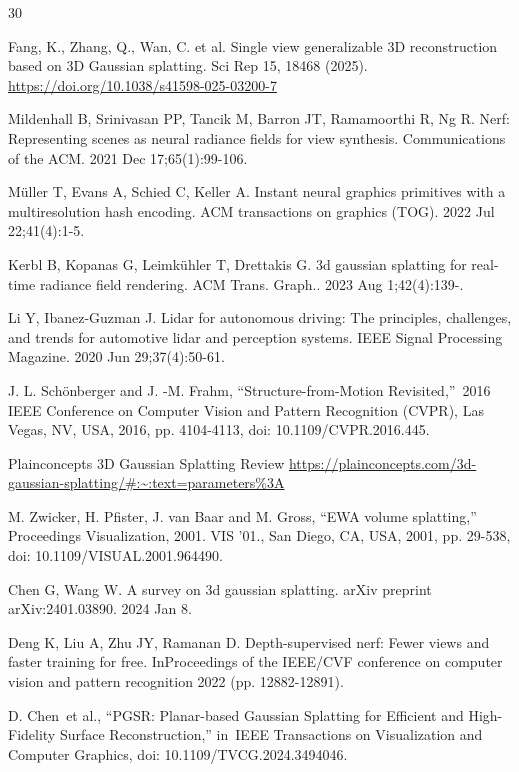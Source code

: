 \documentclass[11pt,a4paper]{article}
\begin{document}
\clearpage
{}
{}
\begin{thebibliography}{30}

Fang, K., Zhang, Q., Wan, C. et al. Single view generalizable 3D reconstruction based on 3D Gaussian splatting. Sci Rep 15, 18468 (2025). \url{https://doi.org/10.1038/s41598-025-03200-7}

Mildenhall B, Srinivasan PP, Tancik M, Barron JT, Ramamoorthi R, Ng R. Nerf: Representing scenes as neural radiance fields for view synthesis. Communications of the ACM. 2021 Dec 17;65(1):99-106.

Müller T, Evans A, Schied C, Keller A. Instant neural graphics primitives with a multiresolution hash encoding. ACM transactions on graphics (TOG). 2022 Jul 22;41(4):1-5.

Kerbl B, Kopanas G, Leimkühler T, Drettakis G. 3d gaussian splatting for real-time radiance field rendering. ACM Trans. Graph.. 2023 Aug 1;42(4):139-.

Li Y, Ibanez-Guzman J. Lidar for autonomous driving: The principles, challenges, and trends for automotive lidar and perception systems. IEEE Signal Processing Magazine. 2020 Jun 29;37(4):50-61.

J. L. Schönberger and J. -M. Frahm, ``Structure-from-Motion Revisited,''~2016 IEEE Conference on Computer Vision and Pattern Recognition (CVPR), Las Vegas, NV, USA, 2016, pp. 4104-4113, doi: 10.1109/CVPR.2016.445.

Plainconcepts 3D Gaussian Splatting Review \url{https://plainconcepts.com/3d-gaussian-splatting/#:~:text=parameters%3A}

M. Zwicker, H. Pfister, J. van Baar and M. Gross, ``EWA volume splatting,'' Proceedings Visualization, 2001. VIS '01., San Diego, CA, USA, 2001, pp. 29-538, doi: 10.1109/VISUAL.2001.964490.

Chen G, Wang W. A survey on 3d gaussian splatting. arXiv preprint arXiv:2401.03890. 2024 Jan 8.

Deng K, Liu A, Zhu JY, Ramanan D. Depth-supervised nerf: Fewer views and faster training for free. InProceedings of the IEEE/CVF conference on computer vision and pattern recognition 2022 (pp. 12882-12891).

D. Chen~et al., ``PGSR: Planar-based Gaussian Splatting for Efficient and High-Fidelity Surface Reconstruction,'' in~IEEE Transactions on Visualization and Computer Graphics, doi: 10.1109/TVCG.2024.3494046.


\end{thebibliography}
\end{document}
